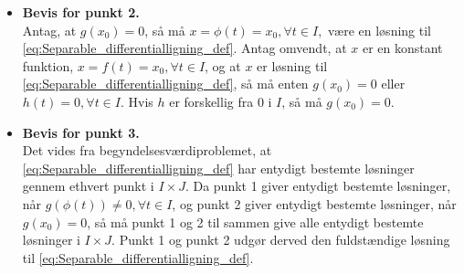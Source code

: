 \begin{bev}
\begin{itemize}
        Ud fra antagelserne om $G(x)$, findes der en invers funktion, $G^{-1}(x)$, så $x = \phi(t) = G^{-1}\left(H(t)\right)$. Da højresiden er differentiabel, er $\phi(t)$ også differentiabel på $I$. Ved at differentiere begge sider af $G(x)=H(t)+k$, med hensyn til $t$, og substituere $x=\phi(t)$ fås
       \begin{align*}
            G'(\phi(t))\phi'(t) &= H'(t)\\
            &\Downarrow\\
            \frac{\phi'(t)}{g(\phi(t)} &= h(t)\\
            &\Updownarrow\\
            \phi'(t) &= g(\phi(t))h(t)
            \intertext{$x=\phi(t)$ substitueres ind i udtrykket.}
            \frac{dx}{dt}&= g(x)h(t)
       \end{align*} 
       Dermed er det bevist, at \eqref{eq:punkt_1_separable_differentialligninger_sætning} er en løsning til \eqref{eq:Separable_differentialligning_def}.
        
            
        \item[] \textbf{Bevis for punkt 2.}\\     
        Antag, at $g(x_0)=0$, så må $x=\phi(t)=x_0, \forall t\in I,$ være en løsning til \eqref{eq:Separable_differentialligning_def}. Antag omvendt, at $x$ er en konstant funktion, $x = f(t) = x_0, \forall t\in I$, og at $x$ er løsning til \eqref{eq:Separable_differentialligning_def}, så må enten $g(x_0)=0$ eller $h(t)=0, \forall t\in I$. Hvis $h$ er forskellig fra $0$ i $I$, så må $g(x_0)=0$.
            

        \item[] \textbf{Bevis for punkt 3.}\\ 
            Det vides fra begyndelsesværdiproblemet, at \eqref{eq:Separable_differentialligning_def} har entydigt bestemte løsninger gennem ethvert punkt i $I\times J$. Da punkt 1 giver entydigt bestemte løsninger, når $g(\phi(t)) \neq 0, \forall t\in I$, og punkt 2 giver entydigt bestemte løsninger, når $g(x_0)=0$, så må punkt 1 og 2 til sammen give alle entydigt bestemte løsninger i $I \times J$. Punkt 1 og punkt 2 udgør derved den fuldstændige løsning til \eqref{eq:Separable_differentialligning_def}.
    \end{itemize}
\end{bev}

